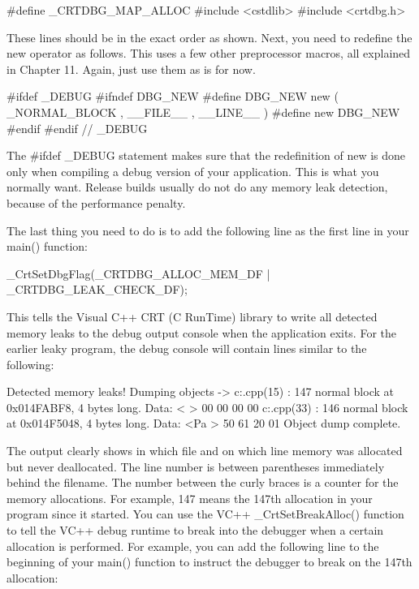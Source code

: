 \begin{cpp}
#define _CRTDBG_MAP_ALLOC
#include <cstdlib>
#include <crtdbg.h>
\end{cpp}

These lines should be in the exact order as shown. Next, you need to redefine the new operator as follows. This uses a few other preprocessor macros, all explained in Chapter 11. Again, just use them as is for now.

\begin{cpp}
#ifdef _DEBUG
    #ifndef DBG_NEW
        #define DBG_NEW new ( _NORMAL_BLOCK , __FILE__ , __LINE__ )
        #define new DBG_NEW
    #endif
#endif // _DEBUG
\end{cpp}

The \#ifdef \_DEBUG statement makes sure that the redefinition of new is done only when compiling a debug version of your application. This is what you normally want. Release builds usually do not do any memory leak detection, because of the performance penalty.

The last thing you need to do is to add the following line as the first line in your main() function:

\begin{cpp}
_CrtSetDbgFlag(_CRTDBG_ALLOC_MEM_DF | _CRTDBG_LEAK_CHECK_DF);
\end{cpp}

This tells the Visual C++ CRT (C RunTime) library to write all detected memory leaks to the debug output console when the application exits. For the earlier leaky program, the debug console will contain lines similar to the following:

\begin{shell}
Detected memory leaks!
Dumping objects ->
c:\leaky\leaky.cpp(15) : {147} normal block at 0x014FABF8, 4 bytes long.
 Data: < > 00 00 00 00
c:\leaky\leaky.cpp(33) : {146} normal block at 0x014F5048, 4 bytes long.
 Data: <Pa > 50 61 20 01
Object dump complete.
\end{shell}

The output clearly shows in which file and on which line memory was allocated but never deallocated. The line number is between parentheses immediately behind the filename. The number between the curly braces is a counter for the memory allocations. For example, {147} means the 147th allocation in your program since it started. You can use the VC++ \_CrtSetBreakAlloc() function to tell the VC++ debug runtime to break into the debugger when a certain allocation is performed. For example, you can add the following line to the beginning of your main() function to instruct the debugger to break on the 147th allocation:

